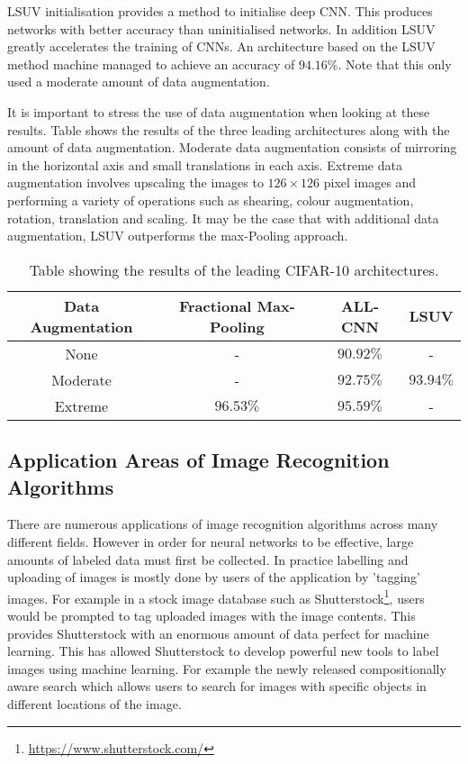 LSUV initialisation provides a method to initialise deep CNN. This produces networks with better accuracy than uninitialised networks. In addition LSUV greatly accelerates the training of CNNs. An architecture based on the LSUV method machine managed to achieve an accuracy of $94.16\%$. Note that this only used a moderate amount of data augmentation.

It is important to stress the use of data augmentation when looking at these results. Table \label{tab:SOA_res} shows the results of the three leading architectures along with the amount of data augmentation. Moderate data augmentation consists of mirroring in the horizontal axis and small translations in each axis. Extreme data augmentation involves upscaling the images to $126\times126$ pixel images and performing a variety of operations such as shearing, colour augmentation, rotation, translation and scaling. It may be the case that with additional data augmentation, LSUV outperforms the max-Pooling approach.

\begin{table}[h]
\begin{center}
 \begin{tabular}{||c || c c c||}
 \hline
 Data Augmentation & Fractional Max-Pooling & ALL-CNN & LSUV \\ [0.5ex]
 \hline\hline
 None & - & $90.92\%$ & - \\
 \hline
 Moderate & - & $92.75\%$ & $93.94\%$\\
 \hline
 Extreme & $96.53\%$ & $95.59\%$ & - \\ [1ex]
 \hline

\end{tabular}
\caption{Table showing the results of the leading CIFAR-10 architectures.}
\end{center}
\end{table}


\subsection{Application Areas of Image Recognition Algorithms}
\label{sec:Application_img_rec}

There are numerous applications of image recognition algorithms across many different fields. However in order for neural networks to be effective, large amounts of labeled data must first be collected. In practice labelling and uploading of images is mostly done by users of the application by 'tagging' images. For example in a stock image database such as Shutterstock\footnote{\url{https://www.shutterstock.com/}}, users would be prompted to tag uploaded images with the image contents. This provides Shutterstock with an enormous amount of data perfect for machine learning. This has allowed Shutterstock to develop powerful new tools to label images using machine learning. For example the newly released compositionally aware search which allows users to search for images with specific objects in different locations of the image\cite{ranzingercomposition}.

